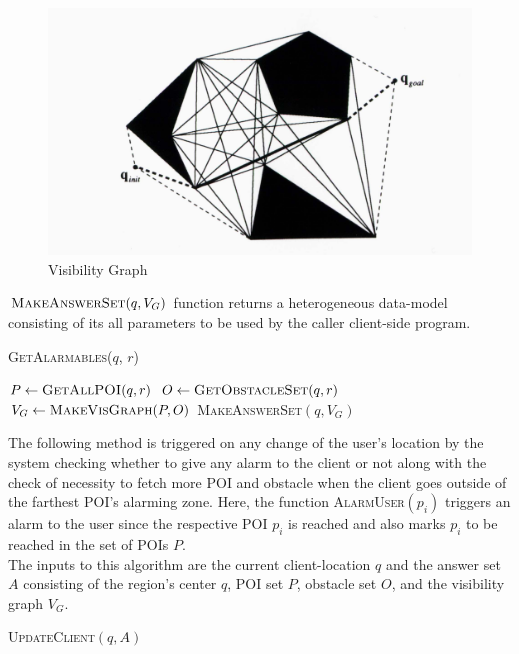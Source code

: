 \begin{figure}[h]
  \includegraphics[width=\linewidth]{visibility_graph.jpg}
  \caption{Visibility Graph}
  \label{fig:visgraph}
\end{figure}
\vspace{5pt}
$\textsc{MakeAnswerSet}(q, V_G)$ function returns a heterogeneous data-model consisting of its all parameters to be used by the caller client-side program.


\DontPrintSemicolon
\begin{algorithm}
\caption{\textsc{GetAlarmables}($q$, $r$)}
	
	 $P \gets \textsc{GetAllPOI}(q, r)$ \;
	 $O \gets \textsc{GetObstacleSet}(q, r)$ \;
	 $V_G \gets \textsc{MakeVisGraph}(P, O)$ \;
	\Return \textsc{MakeAnswerSet}$(q, V_G)$ \;
\label{GetAlarmables}
\end{algorithm}

The following method is triggered on any change of the user's location by the system checking whether to give any alarm to the client or not along with the check of necessity to fetch more POI and obstacle when the client goes outside of the farthest POI's alarming zone.
Here, the function \textsc{AlarmUser}$(p_i)$ triggers an alarm to the user since the respective POI $p_i$ is reached and also marks $p_i$ to be reached in the set of POIs $P$. \\
The inputs to this algorithm are the current client-location $q$ and the answer set $A$ consisting of the region's center $q$,%
POI set $P$, obstacle set $O$, and the visibility graph $V_G$.
\begin{algorithm}
\caption{\textsc{UpdateClient}$(q, A)$}

    
	  {
	}
\label{UpdateClient}
\end{algorithm}


